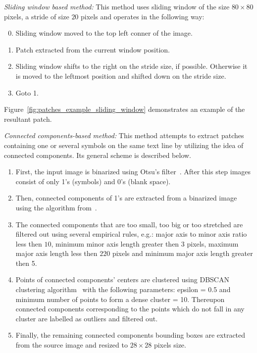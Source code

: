 \documentclass[conference]{IEEEtran}
\begin{document}
\textit{Sliding window based method:}
This method uses sliding window of the size $80\times 80$ pixels, a stride of size $20$ pixels and operates in the following way:
\begin{enumerate}
  \setcounter{enumi}{-1}
	\item Sliding window moved to the top left conner of the image.
	\item Patch extracted from the current window position.
	\item Sliding window shifts to the right on the stride size, if possible. Otherwise it is moved to the leftmost position and shifted down on the stride size.
	\item Goto 1.
\end{enumerate} 
Figure~\ref{fig:patches_example_sliding_window} demonstrates an example of the resultant patch.

\textit{Connected components-based method:}
This method attempts to extract patches containing one or several symbols on the same text line by utilizing the idea of connected components. Its general scheme is described below.
\begin{enumerate}
	\item First, the input image is binarized using Otsu's filter~\cite{otsu1975threshold}. After this step images consist of only 1's (symbols) and 0's (blank space).
	\item Then, connected components of 1's are extracted from a binarized image using the algorithm from~\cite{fiorio1996connected_components}. 
	\item The connected components that are too small, too big or too stretched are filtered out using several empirical rules, e.g.: major axis to minor axis ratio less then $10$, minimum minor axis length greater then $3$ pixels, maximum major axis length less then $220$ pixels and  minimum major axis length greater then 5.
	\item Points of connected components' centers are clustered using DBSCAN clustering algorithm~\cite{ester1996dbscan,GranVolk} with the following parameters: epsilon = 0.5 and minimum number of points to form a dense cluster = 10. Thereupon connected components corresponding to the points which do not fall in any cluster are labelled as outliers and filtered out.
	\item Finally, the remaining connected components bounding boxes are extracted from the source image and resized to $28\times 28$ pixels size.
\end{enumerate}
\end{document}
